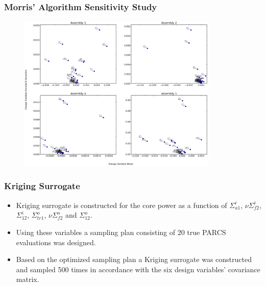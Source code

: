 \documentclass{beamer}
\begin{document}
\begin{frame}
\frametitle{Morris' Algorithm Sensitivity Study}

\begin{figure}
  \includegraphics[width=0.85\textwidth]{./tmi_important_vars.png}
\end{figure} 

\end{frame}
\begin{frame}
\frametitle{Kriging Surrogate}

\begin{itemize}
  \item Kriging surrogate is constructed for the core power as a function of $\Sigma_{a1}^i$, $\nu\Sigma_{f2}^i$, $\Sigma_{12}^i$, $\Sigma_{tr1}^o$, $\nu\Sigma_{f2}^o$ and $\Sigma_{12}^o$. 
  \item Using these variables a sampling plan consisting of 20 true PARCS evaluations was designed.
  \item Based on the optimized sampling plan a Kriging surrogate was constructed and sampled 500 times in accordance with the six design variables' covariance matrix.
\end{itemize}

\end{frame}
\end{document}

